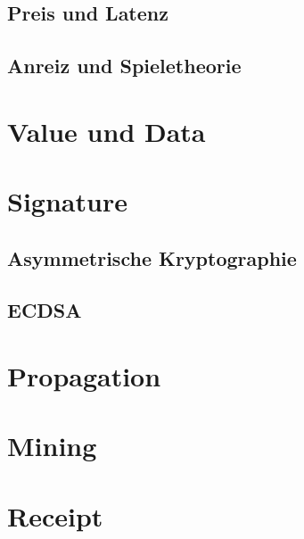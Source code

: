 \documentclass{llncs}
\begin{document}
\subsection{Preis und Latenz}

\subsection{Anreiz und Spieletheorie}

\section{Value und Data}

\section{Signature}

\subsection{Asymmetrische Kryptographie}

\subsection{ECDSA}

\section{Propagation}

\section{Mining}

\section{Receipt}



\end{document}
